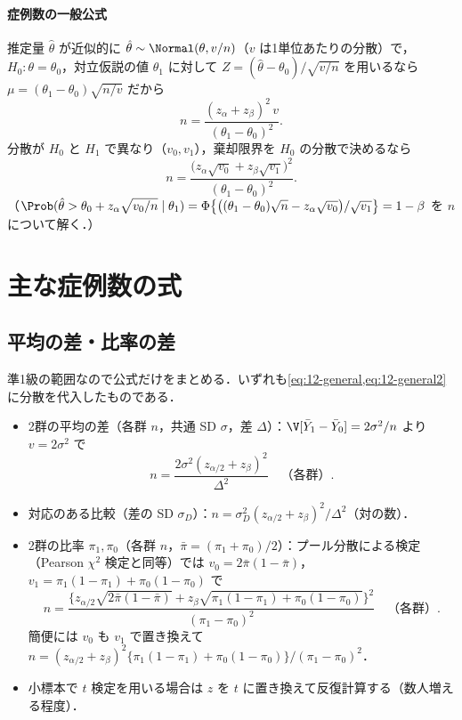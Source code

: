 \paragraph{症例数の一般公式}
推定量 $\hat\theta$ が近似的に $\hat\theta\sim\Normal(\theta,v/n)$（$v$ は1単位あたりの分散）で，$H_0:\theta=\theta_0$，対立仮説の値 $\theta_1$ に対して
$Z=(\hat\theta-\theta_0)/\sqrt{v/n}$ を用いるなら $\mu=(\theta_1-\theta_0)\sqrt{n/v}$ だから
\begin{equation}
n=\frac{(z_\alpha+z_\beta)^2\,v}{(\theta_1-\theta_0)^2}.\label{eq:12-general}
\end{equation}
分散が $H_0$ と $H_1$ で異なり（$v_0,v_1$），棄却限界を $H_0$ の分散で決めるなら
\begin{equation}
n=\frac{\bigl(z_\alpha\sqrt{v_0}+z_\beta\sqrt{v_1}\bigr)^2}{(\theta_1-\theta_0)^2}.\label{eq:12-general2}
\end{equation}
（$\Prob(\hat\theta>\theta_0+z_\alpha\sqrt{v_0/n}\mid\theta_1)=\Phi\bigl\{\bigl((\theta_1-\theta_0)\sqrt n-z_\alpha\sqrt{v_0}\bigr)/\sqrt{v_1}\bigr\}=1-\beta$ を $n$ について解く．）

\section{主な症例数の式}\label{sec:12-formulas}
\subsection{平均の差・比率の差}
準1級の範囲なので公式だけをまとめる．いずれも\cref{eq:12-general,eq:12-general2}に分散を代入したものである．
\begin{itemize}
\item 2群の平均の差（各群 $n$，共通 SD $\sigma$，差 $\Delta$）：$\V[\bar Y_1-\bar Y_0]=2\sigma^2/n$ より $v=2\sigma^2$ で
\begin{equation}
n=\frac{2\sigma^2(z_{\alpha/2}+z_\beta)^2}{\Delta^2}\quad\text{（各群）}.\label{eq:12-means}
\end{equation}
\item 対応のある比較（差の SD $\sigma_D$）：$n=\sigma_D^2(z_{\alpha/2}+z_\beta)^2/\Delta^2$（対の数）．
\item 2群の比率 $\pi_1,\pi_0$（各群 $n$，$\bar\pi=(\pi_1+\pi_0)/2$）：プール分散による検定（Pearson $\chi^2$ 検定と同等）では $v_0=2\bar\pi(1-\bar\pi)$，$v_1=\pi_1(1-\pi_1)+\pi_0(1-\pi_0)$ で
\begin{equation}
n=\frac{\bigl\{z_{\alpha/2}\sqrt{2\bar\pi(1-\bar\pi)}+z_\beta\sqrt{\pi_1(1-\pi_1)+\pi_0(1-\pi_0)}\bigr\}^2}{(\pi_1-\pi_0)^2}\quad\text{（各群）}.\label{eq:12-prop}
\end{equation}
簡便には $v_0$ も $v_1$ で置き換えて $n=(z_{\alpha/2}+z_\beta)^2\{\pi_1(1-\pi_1)+\pi_0(1-\pi_0)\}/(\pi_1-\pi_0)^2$．
\item 小標本で $t$ 検定を用いる場合は $z$ を $t$ に置き換えて反復計算する（数人増える程度）．
\end{itemize}

